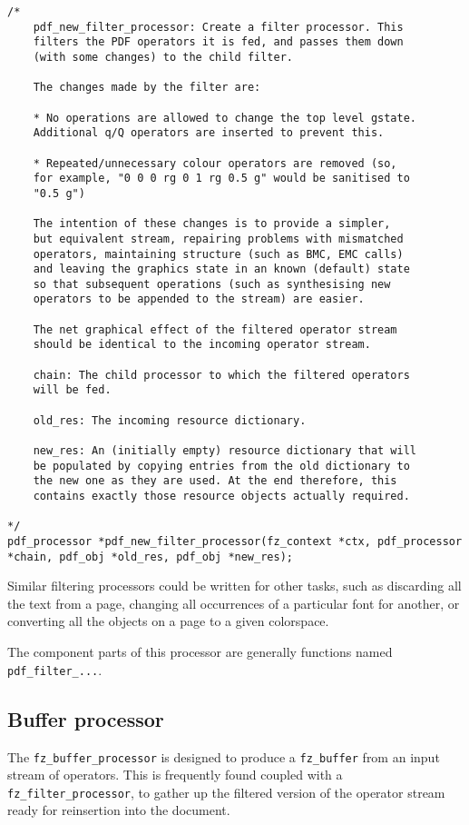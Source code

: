 \documentclass[oneside]{book}
\begin{document}
\begin{lstlisting}
/*
	pdf_new_filter_processor: Create a filter processor. This
	filters the PDF operators it is fed, and passes them down
	(with some changes) to the child filter.

	The changes made by the filter are:

	* No operations are allowed to change the top level gstate.
	Additional q/Q operators are inserted to prevent this.

	* Repeated/unnecessary colour operators are removed (so,
	for example, "0 0 0 rg 0 1 rg 0.5 g" would be sanitised to
	"0.5 g")

	The intention of these changes is to provide a simpler,
	but equivalent stream, repairing problems with mismatched
	operators, maintaining structure (such as BMC, EMC calls)
	and leaving the graphics state in an known (default) state
	so that subsequent operations (such as synthesising new
	operators to be appended to the stream) are easier.

	The net graphical effect of the filtered operator stream
	should be identical to the incoming operator stream.

	chain: The child processor to which the filtered operators
	will be fed.

	old_res: The incoming resource dictionary.

	new_res: An (initially empty) resource dictionary that will
	be populated by copying entries from the old dictionary to
	the new one as they are used. At the end therefore, this
	contains exactly those resource objects actually required.

*/
pdf_processor *pdf_new_filter_processor(fz_context *ctx, pdf_processor *chain, pdf_obj *old_res, pdf_obj *new_res);
\end{lstlisting}

Similar filtering processors could be written for other tasks, such as discarding all the text from a page, changing all occurrences of a particular font for another, or converting all the objects on a page to a given colorspace.

The component parts of this processor are generally functions named \texttt{pdf\_filter\_...}.

\subsection{Buffer processor}

The \texttt{fz\_buffer\_processor} is designed to produce a \texttt{fz\_buffer} from an input stream of operators. This is frequently found coupled with a \texttt{fz\_filter\_processor}, to gather up the filtered version of the operator stream ready for reinsertion into the document.
\end{document}
